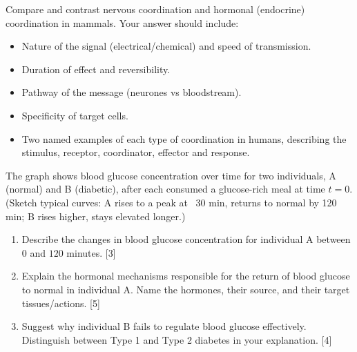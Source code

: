 \documentclass[11pt]{article}
\newcounter{popsec}
\newcounter{popsub}
\newcommand{\courssub}[1]{%
  \stepcounter{popsub}%
  \par\vspace{9pt}\noindent{\popxbold\fontsize{11.5}{13}\selectfont\color{popink}{\color{poporange}\thepopsec.\thepopsub}\hspace{6pt}#1}\par\nopagebreak\vspace{4pt}
}
\begin{document}
\courssub{I prepare for the GCE}

\begin{exercice}
Compare and contrast nervous coordination and hormonal (endocrine) coordination in mammals. Your answer should include:
\begin{itemize}
\item Nature of the signal (electrical/chemical) and speed of transmission.
\item Duration of effect and reversibility.
\item Pathway of the message (neurones vs bloodstream).
\item Specificity of target cells.
\item Two named examples of each type of coordination in humans, describing the stimulus, receptor, coordinator, effector and response.
\end{itemize}
\end{exercice}

\begin{exercice}
The graph shows blood glucose concentration over time for two individuals, A (normal) and B (diabetic), after each consumed a glucose-rich meal at time $t=0$. (Sketch typical curves: A rises to a peak at ~30 min, returns to normal by 120 min; B rises higher, stays elevated longer.)

\begin{enumerate}
\item Describe the changes in blood glucose concentration for individual A between $0$ and $120$ minutes. [3]
\item Explain the hormonal mechanisms responsible for the return of blood glucose to normal in individual A. Name the hormones, their source, and their target tissues/actions. [5]
\item Suggest why individual B fails to regulate blood glucose effectively. Distinguish between Type 1 and Type 2 diabetes in your explanation. [4]
\end{enumerate}
\end{exercice}
\end{document}
